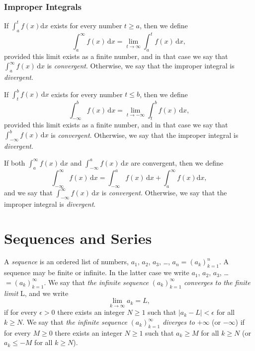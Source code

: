 \documentclass[captions=tableheading]{scrbook}
\begin{document}
\begin{example}
\subsubsection{Improper Integrals}
\label{sec-21-2-4-4}


If \(\int_{a}^{t}f(x)\mathrm{d} x\) exists for every number \(t\geq a\), then we define 
\begin{equation}
\int_{a}^{\infty}f(x)\,\mathrm{d} x=\lim_{t\to\infty}\int_{a}^{t}f(x)\,\mathrm{d} x,
\end{equation}
provided this limit exists as a finite number, and in that case we say that \(\int_{a}^{\infty}f(x)\,\mathrm{d} x\) is \emph{convergent}. Otherwise, we say that the improper integral is \emph{divergent}.

If \(\int_{t}^{b}f(x)\,\mathrm{d} x\) exists for every number \(t\leq b\), then we define
\begin{equation}
\int_{-\infty}^{b}f(x)\,\mathrm{d} x=\lim_{t\to-\infty}\int_{t}^{b}f(x)\,\mathrm{d} x,
\end{equation}
provided this limit exists as a finite number, and in that case we say that \(\int_{-\infty}^{b}f(x)\,\mathrm{d} x\) is \emph{convergent}. Otherwise, we say that the improper integral is \emph{divergent}.

If both \(\int_{a}^{\infty}f(x)\,\mathrm{d} x\) and \(\int_{-\infty}^{a}f(x)\,\mathrm{d} x\) are convergent, then we define
\begin{equation}
\int_{-\infty}^{\infty}f(x)\,\mathrm{d} x=\int_{-\infty}^{a}f(x)\,\mathrm{d} x+\int_{a}^{\infty}f(x)\mathrm{d} x,
\end{equation}
and we say that \(\int_{-\infty}^{\infty}f(x)\,\mathrm{d} x\) is \emph{convergent}. Otherwise, we say that the improper integral is \emph{divergent}.
\section{Sequences and Series}
\label{sec-21-3}
\label{sec-Sequences-and-Series}


A \emph{sequence} is an ordered list of numbers, \(a_{1}\), \(a_{2}\), \(a_{3}\), \ldots{}, \(a_{n} =\left(a_{k}\right)_{k=1}^{n}\). A sequence may be finite or infinite. In the latter case we write \(a_{1}\), \(a_{2}\), \(a_{3}\), \ldots{} \( =\left(a_{k}\right)_{k=1}^{\infty}\). We say that \emph{the infinite sequence} \(\left(a_{k}\right)_{k=1}^{\infty}\) \emph{converges to the finite limit} L, and we write
\begin{equation}
\lim_{k\to\infty}a_{k} = L,
\end{equation}
if for every \(\epsilon > 0\) there exists an integer \(N \geq 1\) such that \(|a_{k} - L| < \epsilon\) for all \(k \geq N\). We say that \emph{the infinite sequence} \(\left(a_{k}\right)_{k=1}^{\infty}\) \emph{diverges to} \(+\infty\) (or \( -\infty\)) if for every \(M\geq0\) there exists an integer \(N\geq1\) such that \(a_{k} \geq M\) for all \(k \geq N\) (or \(a_{k} \leq - M\) for all \(k \geq N\)).

\end{example}
\end{document}
